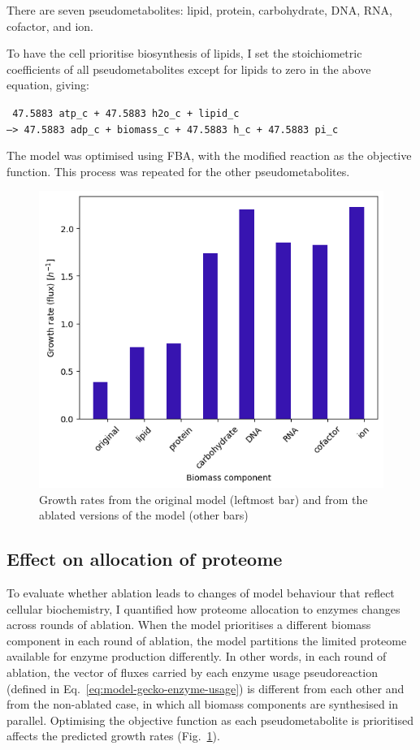 There are seven pseudometabolites: lipid, protein, carbohydrate, DNA, RNA, cofactor, and ion.

To have the cell prioritise biosynthesis of lipids, I set the stoichiometric coefficients of all pseudometabolites except for lipids to zero in the above equation, giving:

\texttt{
  47.5883 atp\_c + 47.5883 h2o\_c + lipid\_c \\
  --> 47.5883 adp\_c + biomass\_c + 47.5883 h\_c + 47.5883 pi\_c
}

The model was optimised using FBA, with the modified reaction as the objective function.
This process was repeated for the other pseudometabolites.

\begin{figure}
  \centering
  \includegraphics[width=.6\linewidth]{ablation_example_fluxes.png}
  \caption{
    Growth rates from the original model (leftmost bar) and from the ablated versions of the model (other bars)
  }
  \label{fig:model-ablate-fluxes}
\end{figure}


\subsection{Effect on allocation of proteome}
\label{sec:model-yeast8-pseudometabolites-allocation}

To evaluate whether ablation leads to changes of model behaviour that reflect cellular biochemistry, I quantified how proteome allocation to enzymes changes across rounds of ablation.
When the model prioritises a different biomass component in each round of ablation, the model partitions the limited proteome available for enzyme production differently.
In other words, in each round of ablation, the vector of fluxes carried by each enzyme usage pseudoreaction (defined in Eq.\ \ref{eq:model-gecko-enzyme-usage}) is different from each other and from the non-ablated case, in which all biomass components are synthesised in parallel.
Optimising the objective function as each pseudometabolite is prioritised affects the predicted growth rates (Fig.\ \ref{fig:model-ablate-fluxes}).

